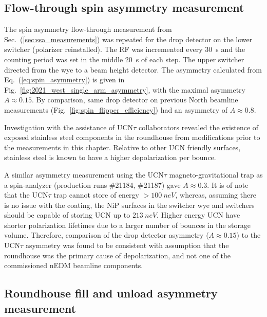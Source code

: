 

\subsection{Flow-through spin asymmetry measurement}\label{sec:single_arm_flow_through_west_2021}


The spin asymmetry flow-through measurement from Sec.~(\ref{sec:ssa_measurements}) was repeated for the drop detector on the lower switcher (polarizer reinstalled). The RF was incremented every \qty{30}{s} and the counting period was set in the middle \qty{20}{s} of each step.  The upper switcher directed \ucn from the wye to a beam height detector. The asymmetry calculated from Eq.~(\ref{eq:spin_asymmetry}) is given in Fig.~\ref{fig:2021_west_single_arm_asymmetry}, with the maximal asymmetry $A\approx 0.15$. By comparison, same drop detector on previous North beamline measurements (Fig.~\ref{fig:spin_flipper_efficiency}) had an asymmetry of $A\approx 0.8$.

Investigation with the assistance of UCN$\tau$ collaborators revealed the existence of exposed stainless steel components in the roundhouse from modifications prior to the measurements in this chapter. Relative to other UCN friendly surfaces, stainless steel is known to have a higher depolarization per bounce. 

A similar asymmetry measurement using the UCN$\tau$ magneto-gravitational trap as a spin-analyzer (production runs \#21184, \#21187) gave $A\approx 0.3$. It is of note that the UCN$\tau$ trap cannot store \ucn of energy $>\qty{100}{neV}$, whereas, assuming there is no issue with the coating, the NiP surfaces in the switcher wye and switchers should be capable of storing UCN up to $\qty{213}{neV}$. Higher energy UCN have shorter polarization lifetimes due to a larger number of bounces in the storage volume. Therefore, comparison of the drop detector asymmetry ($A\approx 0.15$) to the UCN$\tau$ asymmetry was found to be consistent with assumption that the roundhouse was the primary cause of depolarization, and not one of the commissioned nEDM beamline components.



\subsection{Roundhouse fill and unload asymmetry measurement}

